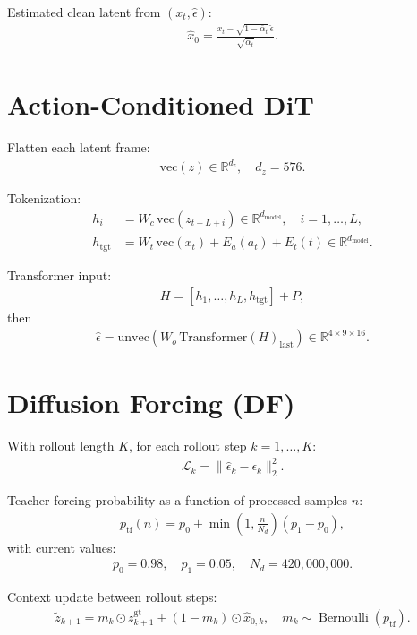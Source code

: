 \documentclass[11pt]{article}
\begin{document}
Estimated clean latent from $(x_t,\hat{\epsilon})$:
\begin{align}
\hat{x}_0 = \frac{x_t-\sqrt{1-\bar{\alpha}_t}\,\hat{\epsilon}}{\sqrt{\bar{\alpha}_t}}.
\end{align}

\section{Action-Conditioned DiT}
Flatten each latent frame:
\begin{align}
\mathrm{vec}(z)\in\mathbb{R}^{d_z},\quad d_z=576.
\end{align}

Tokenization:
\begin{align}
h_i &= W_c\,\mathrm{vec}(z_{t-L+i}) \in \mathbb{R}^{d_{\text{model}}},\quad i=1,\dots,L,\\
h_{\text{tgt}} &= W_t\,\mathrm{vec}(x_t) + E_a(a_t) + E_t(t)\in\mathbb{R}^{d_{\text{model}}}.
\end{align}

Transformer input:
\begin{align}
H = [h_1,\ldots,h_L,h_{\text{tgt}}] + P,
\end{align}
then
\begin{align}
\hat{\epsilon} = \mathrm{unvec}\!\left(W_o\,\mathrm{Transformer}(H)_{\text{last}}\right)
\in\mathbb{R}^{4\times9\times16}.
\end{align}

\section{Diffusion Forcing (DF)}
With rollout length $K$, for each rollout step $k=1,\dots,K$:
\begin{align}
\mathcal{L}_k = \|\hat{\epsilon}_k-\epsilon_k\|_2^2.
\end{align}

Teacher forcing probability as a function of processed samples $n$:
\begin{align}
p_{\text{tf}}(n)
= p_0 + \min\!\left(1,\frac{n}{N_d}\right)(p_1-p_0),
\end{align}
with current values:
\begin{align}
p_0=0.98,\quad p_1=0.05,\quad N_d=420{,}000{,}000.
\end{align}

Context update between rollout steps:
\begin{align}
\tilde{z}_{k+1}
= m_k \odot z_{k+1}^{\text{gt}} + (1-m_k)\odot \hat{x}_{0,k},
\quad
m_k\sim \operatorname{Bernoulli}(p_{\text{tf}}).
\end{align}
\end{document}
